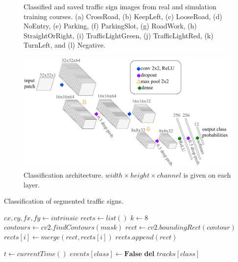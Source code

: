 \begin{figure}[h]
\begin{subfigure}[b]{0.15\linewidth}
    \caption{}
  \end{subfigure}
  \caption{Classified and saved traffic sign images from real and simulation
      training courses. (a) CrossRoad, (b) KeepLeft, (c) LooseRoad, (d)
      NoEntry, (e) Parking, (f) ParkingSlot, (g) RoadWork, (h) StraightOrRight,
      (i) TrafficLightGreen, (j) TrafficLightRed, (k) TurnLeft, and (l)
  Negative.} \label{figure:traffic-sign-classes}
\end{figure}

\begin{figure}[h]
  \centering
  \includegraphics[width=.9\textwidth]{figures/classification-architecture.pdf}
  \caption{Classification architecture. $width \times height\times channel$ is
  given on each layer.}
  \label{figure:classification-architecture}
\end{figure}

\begin{algorithm}[h]
  \caption{Classification of segmented traffic signs.}
  \label{algorithm:classification}
  \begin{algorithmic}[1]
    \State $cx, cy, fx, fy \gets intrinsic$
    \State $rects \gets list()$
    \State $k \gets 8$
    \State $contours \gets cv2.findContours(mask)$
      \State $rect \gets cv2.boundingRect(contour)$
        \State $rects[i] \gets merge(rect, rects[i])$
      \EndIf
      \State $rects.append(rect)$
    \EndFor

    \State $t \gets currentTime()$
      \State $events[class] \gets \textbf{False}$
        \State \textbf{del} $tracks[class]$
      \EndIf
    \EndFor
  \end{algorithmic}
\end{algorithm}

